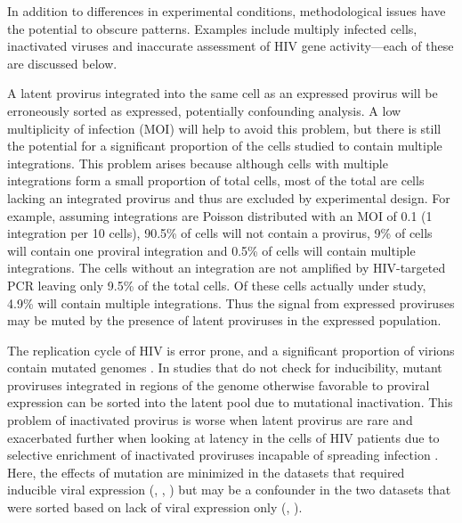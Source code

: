 \documentclass[../sherrill-Mix_thesis.tex]{subfiles}
\begin{document}

	In addition to differences in experimental conditions, methodological issues have the potential to obscure patterns. Examples include multiply infected cells, inactivated viruses and inaccurate assessment of HIV gene activity---each of these are discussed below.

	A latent provirus integrated into the same cell as an expressed provirus will be erroneously sorted as expressed, potentially confounding analysis. A low multiplicity of infection (MOI) will help to avoid this problem, but there is still the potential for a significant proportion of the cells studied to contain multiple integrations. This problem arises because although cells with multiple integrations form a small proportion of total cells, most of the total are cells lacking an integrated provirus and thus are excluded by experimental design. For example, assuming integrations are Poisson distributed with an MOI of 0.1 (1 integration per 10 cells), 90.5\% of cells will not contain a provirus, 9\% of cells will contain one proviral integration and 0.5\% of cells will contain multiple integrations. The cells without an integration are not amplified by HIV-targeted PCR leaving only 9.5\% of the total cells. Of these cells actually under study, 4.9\% will contain multiple integrations. Thus the signal from expressed proviruses may be muted by the presence of latent proviruses in the expressed population. %

	The replication cycle of HIV is error prone, and a significant proportion of virions contain mutated genomes \citep{Mansky1995}. In studies that do not check for inducibility, mutant proviruses integrated in regions of the genome otherwise favorable to proviral expression can be sorted into the latent pool due to mutational inactivation. This problem of inactivated provirus is worse when latent provirus are rare and exacerbated further when looking at latency in the cells of HIV patients due to selective enrichment of inactivated proviruses incapable of spreading infection \citep{Chun1997}. Here, the effects of mutation are minimized in the datasets that required inducible viral expression (\Jurkat{}, \Bcl{}, \Memory{}) but may be a confounder in the two datasets that were sorted based on lack of viral expression only (\Active{}, \Resting{}). 
\end{document}
